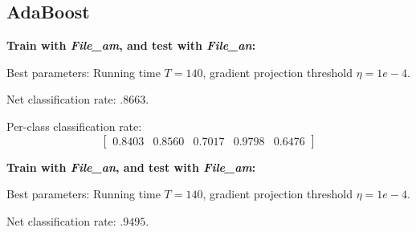 \documentclass[letterpaper]{article}
\begin{document}
\subsection*{AdaBoost}
\textbf{Train with \textit{File\_am}, and test with \textit{File\_an}:}

Best parameters: Running time $T=140$, gradient projection threshold $\eta=1e-4$.

Net classification rate: $.8663$.

Per-class classification rate: 
$$\begin{bmatrix} 0.8403  &  0.8560   & 0.7017 &   0.9798  &  0.6476\end{bmatrix}$$

\textbf{Train with \textit{File\_an}, and test with \textit{File\_am}:}

Best parameters: Running time $T=140$, gradient projection threshold $\eta=1e-4$.

Net classification rate: $.9495$.
\end{document}
